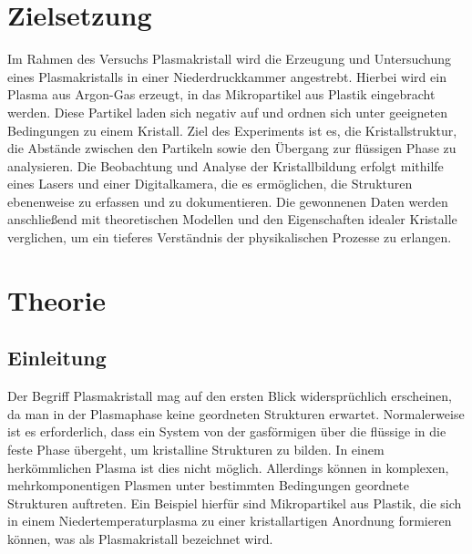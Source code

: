 \documentclass[12pt,a4paper,ngerman]{article}
\begin{document}
\setcounter{secnumdepth}{3}
\setcounter{tocdepth}{3}


	
\section*{Zielsetzung}
Im Rahmen des Versuchs \glqq{}Plasmakristall\grqq{} wird die Erzeugung und Untersuchung eines Plasmakristalls in einer Niederdruckkammer angestrebt. Hierbei wird ein Plasma aus Argon-Gas erzeugt, in das Mikropartikel aus Plastik eingebracht werden. Diese Partikel laden sich negativ auf und ordnen sich unter geeigneten Bedingungen zu einem Kristall. Ziel des Experiments ist es, die Kristallstruktur, die Abstände zwischen den Partikeln sowie den Übergang zur flüssigen Phase zu analysieren. Die Beobachtung und Analyse der Kristallbildung erfolgt mithilfe eines Lasers und einer Digitalkamera, die es ermöglichen, die Strukturen ebenenweise zu erfassen und zu dokumentieren. Die gewonnenen Daten werden anschließend mit theoretischen Modellen und den Eigenschaften idealer Kristalle verglichen, um ein tieferes Verständnis der physikalischen Prozesse zu erlangen.


\section{Theorie}
\subsection{Einleitung} Der Begriff \glqq{}Plasmakristall\grqq{} mag auf den ersten Blick widersprüchlich erscheinen, da man in der Plasmaphase keine geordneten Strukturen erwartet. Normalerweise ist es erforderlich, dass ein System von der gasförmigen über die flüssige in die feste Phase übergeht, um kristalline Strukturen zu bilden. In einem herkömmlichen Plasma ist dies nicht möglich. Allerdings können in komplexen, mehrkomponentigen Plasmen unter bestimmten Bedingungen geordnete Strukturen auftreten. Ein Beispiel hierfür sind Mikropartikel aus Plastik, die sich in einem Niedertemperaturplasma zu einer kristallartigen Anordnung formieren können, was als Plasmakristall bezeichnet wird.
\end{document}
